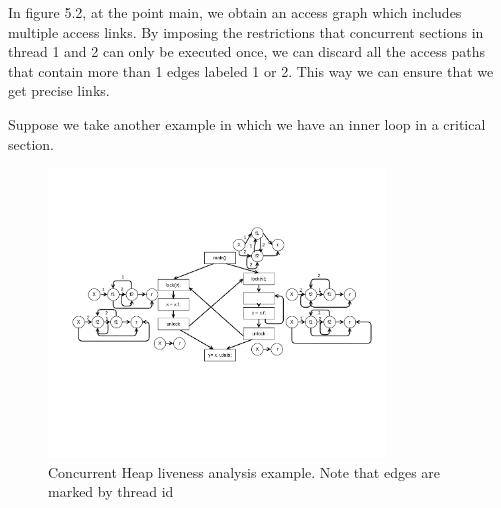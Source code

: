 In figure 5.2, at the point main, we obtain an access graph which includes multiple access links. By imposing the restrictions that concurrent sections in thread 1 and 2 can only be executed once, we can discard all the access paths that contain more than 1 edges labeled 1 or 2. This way we can ensure that we get precise links.

Suppose we take another example in which we have an inner loop in a critical section. 

\begin{figure}
	\centering
	\includegraphics[width=0.8\textwidth]{Figures/crop.png}
	\caption{Concurrent Heap liveness analysis example. Note that edges are marked by thread id}
	\label{fig:threadidanalysis}
\end{figure}

          
